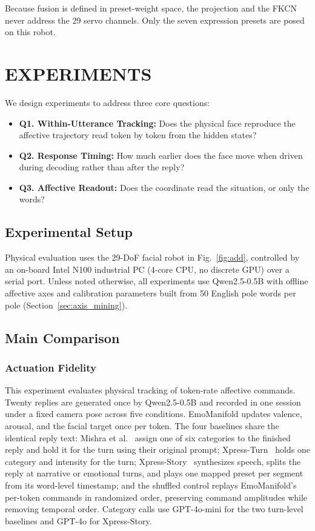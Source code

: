 \documentclass[letterpaper, 10 pt, conference]{ieeeconf}
\begin{document}
Because fusion is defined in preset-weight space, the projection and the FKCN never address the 29 servo channels. Only the seven expression presets are posed on this robot.

\section{EXPERIMENTS}
\label{sec:experiments}

We design experiments to address three core questions:
\begin{itemize}
\item \textbf{Q1. Within-Utterance Tracking:} Does the physical face reproduce the affective trajectory read token by token from the hidden states?
\item \textbf{Q2. Response Timing:} How much earlier does the face move when driven during decoding rather than after the reply?
\item \textbf{Q3. Affective Readout:} Does the coordinate read the situation, or only the words?
\end{itemize}

\subsection{Experimental Setup}

Physical evaluation uses the 29-DoF facial robot in Fig.~\ref{fig:add}, controlled by an on-board Intel N100 industrial PC (4-core CPU, no discrete GPU) over a serial port. Unless noted otherwise, all experiments use Qwen2.5-0.5B with offline affective axes and calibration parameters built from 50 English pole words per pole (Section~\ref{sec:axis_mining}).

\subsection{Main Comparison}
\label{sec:exp_hardware}

\subsubsection{Actuation Fidelity}
This experiment evaluates physical tracking of token-rate affective commands. Twenty replies are generated once by Qwen2.5-0.5B and recorded in one session under a fixed camera pose across five conditions. EmoManifold updates valence, arousal, and the facial target once per token. The four baselines share the identical reply text: Mishra et al.~\cite{mishra2023realtime} assign one of six categories to the finished reply and hold it for the turn using their original prompt; Xpress-Turn~\cite{antony2025xpress} holds one category and intensity for the turn; Xpress-Story~\cite{antony2025xpress} synthesizes speech, splits the reply at narrative or emotional turns, and plays one mapped preset per segment from its word-level timestamp; and the shuffled control replays EmoManifold's per-token commands in randomized order, preserving command amplitudes while removing temporal order. Category calls use GPT-4o-mini for the two turn-level baselines and GPT-4o for Xpress-Story.
\end{document}
